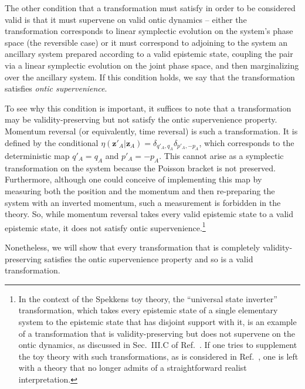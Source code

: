\documentclass[pra,superscriptaddress,nofootinbib,12pt]{revtex4-2}
\begin{document}
The other condition that a transformation must satisfy in order to be considered valid is that it must supervene on valid ontic dynamics -- either the transformation corresponds to linear symplectic evolution on the system's phase space (the reversible case) or it must correspond to adjoining to the system an ancillary system prepared according to a valid epistemic state, coupling the pair via a linear symplectic evolution on the joint phase space, and then marginalizing over the ancillary system.  If this condition holds, we say that the transformation satisfies \emph{ontic supervenience}.

To see why this condition is important, it suffices to note that a transformation may be validity-preserving but not satisfy the ontic supervenience property. Momentum reversal (or equivalently, time reversal) is such a transformation.  It is defined by the conditional $\eta(\mathbf{z}'_{A}|\mathbf{z}_A) =\delta_{q'_{A},q_{A}}\delta_{p'_{A},-p_{A}}$, which corresponds to the deterministic map $q'_{A}=q_{A}$ and $p'_{A}=-p_{A}$.  This cannot arise as a symplectic transformation on the system because the Poisson bracket is not preserved.  Furthermore, although one could conceive of implementing this map by measuring both the position and the momentum and then re-preparing the system with an inverted momentum, such a measurement is forbidden in the theory.
So, while momentum reversal takes every valid epistemic state to a valid epistemic state, it does not satisfy ontic supervenience.\footnote{In the context of the Spekkens toy theory, the ``universal state inverter'' transformation, which takes every epistemic state of a single elementary system to the epistemic state that has disjoint support with it, is an example of a transformation that is validity-preserving but does not supervene on the ontic dynamics, as discussed in Sec.~III.C of Ref.~\cite{Spe07}. If one tries to  supplement the toy theory with such transformations, as is considered in Ref.~\cite{Sko08}, one is left with a theory that no longer admits of a straightforward realist interpretation.}

Nonetheless, we will show that every transformation that is completely validity-preserving satisfies the ontic supervenience property and so is a valid transformation.
\end{document}
